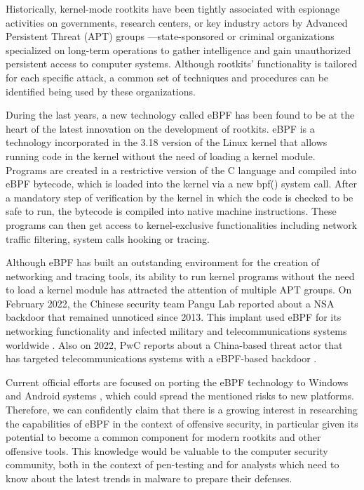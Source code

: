 Historically, kernel-mode rootkits have been tightly associated with
espionage activities on governments, research centers, or key industry
actors by Advanced Persistent Threat (APT) groups
\cite{rootkit_ptsecurity}---state-sponsored or criminal organizations
specialized on long-term operations to gather intelligence and gain
unauthorized persistent access to computer systems. Although rootkits'
functionality is tailored for each specific attack, a common set of
techniques and procedures can be identified being used by these
organizations.

During the last years, a new technology called eBPF has been found to be at
the heart of the latest innovation on the development of rootkits.  eBPF is
a technology incorporated in the 3.18 version of the Linux kernel
\cite{ebpf_linux318} that allows running code in the kernel without the
need of loading a kernel module. Programs are created in a restrictive
version of the C language and compiled into eBPF bytecode, which is loaded
into the kernel via a new bpf() system call. After a mandatory step of
verification by the kernel in which the code is checked to be safe to run,
the bytecode is compiled into native machine instructions. These programs
can then get access to kernel-exclusive functionalities including network
traffic filtering, system calls hooking or tracing.

Although eBPF has built an outstanding environment for the creation of
networking and tracing tools, its ability to run kernel programs without
the need to load a kernel module has attracted the attention of multiple
APT groups. On February 2022, the Chinese security team Pangu Lab reported
about a NSA backdoor that remained unnoticed since 2013. This implant used
eBPF for its networking functionality and infected military and
telecommunications systems worldwide \cite{bvp47_report}. Also on 2022, PwC
reports about a China-based threat actor that has targeted
telecommunications systems with a eBPF-based backdoor \cite{bpfdoor_pwc}.

Current official efforts are focused on porting the eBPF technology to
Windows \cite{ebpf_windows} and Android systems \cite{ebpf_android}, which
could spread the mentioned risks to new platforms.  Therefore, we can
confidently claim that there is a growing interest in researching the
capabilities of eBPF in the context of offensive security, in particular
given its potential to become a common component for modern rootkits and
other offensive tools. This knowledge would be valuable to the computer
security community, both in the context of pen-testing and for analysts
which need to know about the latest trends in malware to prepare their
defenses.


